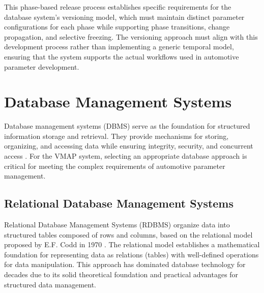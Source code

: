 This phase-based release process establishes specific requirements for the database system's versioning model, which must maintain distinct parameter configurations for each phase while supporting phase transitions, change propagation, and selective freezing. The versioning approach must align with this development process rather than implementing a generic temporal model, ensuring that the system supports the actual workflows used in automotive parameter development.

\section{Database Management Systems}
\label{sec}

Database management systems (DBMS) serve as the foundation for structured information storage and retrieval. They provide mechanisms for storing, organizing, and accessing data while ensuring integrity, security, and concurrent access \cite{elmasri2015fundamentals}. For the \ac{VMAP} system, selecting an appropriate database approach is critical for meeting the complex requirements of automotive parameter management.

\subsection{Relational Database Management Systems}
\label{subsec:relational-database-management-systems}

Relational Database Management Systems (RDBMS) organize data into structured tables composed of rows and columns, based on the relational model proposed by E.F. Codd in 1970 \cite{codd1970relational}. The relational model establishes a mathematical foundation for representing data as relations (tables) with well-defined operations for data manipulation. This approach has dominated database technology for decades due to its solid theoretical foundation and practical advantages for structured data management.


